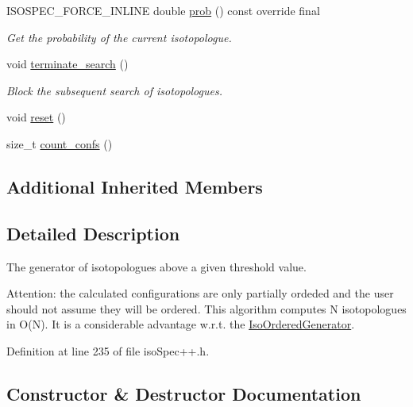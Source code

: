 \begin{DoxyCompactItemize}
I\+S\+O\+S\+P\+E\+C\+\_\+\+F\+O\+R\+C\+E\+\_\+\+I\+N\+L\+I\+NE double \mbox{\hyperlink{class_iso_spec_1_1_iso_threshold_generator_a998d987f81b2ca7ed610294f6a5f8df5}{prob}} () const override final
\begin{DoxyCompactList}\small\item\em Get the probability of the current isotopologue. \end{DoxyCompactList}\item 
\mbox{\label{class_iso_spec_1_1_iso_threshold_generator_ac6aa2fff002a76b0beae1995f34ae5f6}} 
void \mbox{\hyperlink{class_iso_spec_1_1_iso_threshold_generator_ac6aa2fff002a76b0beae1995f34ae5f6}{terminate\+\_\+search}} ()
\begin{DoxyCompactList}\small\item\em Block the subsequent search of isotopologues. \end{DoxyCompactList}\item 
void \mbox{\hyperlink{class_iso_spec_1_1_iso_threshold_generator_ab830ffa21469df45a513ff1dcaf5d9e7}{reset}} ()
\item 
size\+\_\+t \mbox{\hyperlink{class_iso_spec_1_1_iso_threshold_generator_ad29d8761174bca7b1846ddec03b33528}{count\+\_\+confs}} ()
\end{DoxyCompactItemize}
\subsection*{Additional Inherited Members}


\subsection{Detailed Description}
The generator of isotopologues above a given threshold value. 

Attention\+: the calculated configurations are only partially ordeded and the user should not assume they will be ordered. This algorithm computes N isotopologues in O(\+N). It is a considerable advantage w.\+r.\+t. the \mbox{\hyperlink{class_iso_spec_1_1_iso_ordered_generator}{Iso\+Ordered\+Generator}}. 

Definition at line 235 of file iso\+Spec++.\+h.



\subsection{Constructor \& Destructor Documentation}
\mbox{\label{class_iso_spec_1_1_iso_threshold_generator_a3abbcf1d810b6cad9400bd2552c3faf1}} 
